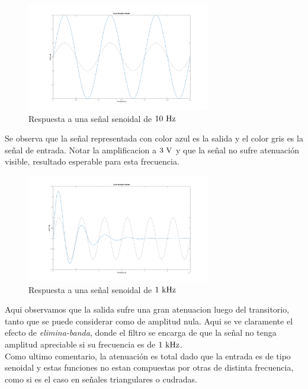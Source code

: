 \begin{figure}[hbt]
	\centering
	\includegraphics[width=8cm]{imagenes/rtasen10}	\caption{Respuesta a una señal senoidal de $10\ \si{\hertz}$}	
\end{figure}

Se observa que la señal representada con color azul es la salida  y el color gris es la señal de entrada. Notar la amplificacion a $3\ \si{\volt}$ y que la señal no sufre atenuaci\'on visible, resultado esperable para esta frecuencia.\\

\begin{figure}[!h]
	\centering
	\includegraphics[width=8cm]{imagenes/rtasen1k}	\caption{Respuesta a una señal senoidal de $1\ \si{\kilo\hertz}$}	
\end{figure}

Aqui observamos que la salida sufre una gran atenuacion luego del transitorio, tanto que se puede considerar como de amplitud nula. Aqui se ve claramente el efecto de \textit{elimina-banda}, donde el filtro se encarga de que la señal no tenga amplitud apreciable si su frecuencia es de $1\ \si{\kilo\hertz}$.\\
Como ultimo comentario, la atenuaci\'on es total dado que la entrada es de tipo senoidal y estas funciones no estan compuestas por otras de distinta frecuencia,  como si es el  caso en señales triangulares o cudradas.\\

